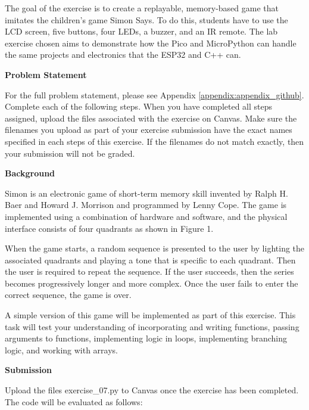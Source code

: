 The goal of the exercise is to create a replayable, memory-based game that imitates the
children's game Simon Says. To do this, students have to use the LCD screen, five 
buttons, four LEDs, a buzzer, and an IR remote. The lab exercise chosen aims to 
demonstrate how the Pico and MicroPython can handle the same projects and electronics 
that the ESP32 and C++ can. 

\label{comp_app_assignment_1}

\begin{tcolorbox}[breakable, enhanced jigsaw, title=ME 400: Assignment \ref{comp_app_assignment_1}, 
    colframe=ksu-purple, colback=ksu-gray]
    \textbf{Problem Statement}
    \parindent15pt

    For the full problem statement, please see Appendix \ref{appendix:appendix_github}.
    Complete each of the following steps. When you have completed all steps assigned, upload the
    files associated with the exercise on Canvas. Make sure the filenames you upload as part of
    your exercise submission have the exact names specified in each steps of this exercise. If the
    filenames do not match exactly, then your submission will not be graded.

    \medskip
    \noindent \textbf{Background}

    Simon is an electronic game of short-term memory skill invented by Ralph H. Baer and Howard J.
    Morrison and programmed by Lenny Cope. The game is implemented using a combination of hardware
    and software, and the physical interface consists of four quadrants as shown in Figure 1.

    When the game starts, a random sequence is presented to the user by lighting the associated
    quadrants and playing a tone that is specific to each quadrant. Then the user is required to repeat the
    sequence. If the user succeeds, then the series becomes progressively longer and more complex.
    Once the user fails to enter the correct sequence, the game is over.

    A simple version of this game will be implemented as part of this exercise. This task will test your
    understanding of incorporating and writing functions, passing arguments to functions, implementing
    logic in loops, implementing branching logic, and working with arrays.

    \medskip
    \noindent \textbf{Submission}

    Upload the files exercise\_07.py to Canvas once the exercise has been completed. The code will
    be evaluated as follows:


\end{tcolorbox}
